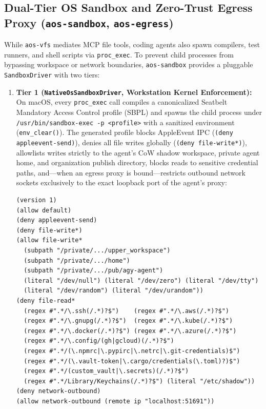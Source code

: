 \documentclass[acmsmall,screen,review]{acmart}
\begin{document}
\subsection{Dual-Tier OS Sandbox and Zero-Trust Egress Proxy (\texttt{aos-sandbox}, \texttt{aos-egress})}
\label{sec:sandbox}

While \texttt{aos-vfs} mediates MCP file tools, coding agents also spawn compilers, test runners, and shell scripts via \texttt{proc\_exec}. To prevent child processes from bypassing workspace or network boundaries, \texttt{aos-sandbox} provides a pluggable \texttt{SandboxDriver} with two tiers:

\begin{enumerate}
    \item \textbf{Tier 1 (\texttt{NativeOsSandboxDriver}, Workstation Kernel Enforcement):} On macOS, every \texttt{proc\_exec} call compiles a canonicalized Seatbelt Mandatory Access Control profile (SBPL) and spawns the child process under \texttt{/usr/bin/sandbox-exec -p <profile>} with a sanitized environment (\texttt{env\_clear()}). The generated profile blocks AppleEvent IPC (\texttt{(deny appleevent-send)}), denies all file writes globally (\texttt{(deny file-write*)}), allowlists writes strictly to the agent's CoW shadow workspace, private agent home, and organization publish directory, blocks reads to sensitive credential paths, and---when an egress proxy is bound---restricts outbound network sockets exclusively to the exact loopback port of the agent's proxy:
\begin{lstlisting}
(version 1)
(allow default)
(deny appleevent-send)
(deny file-write*)
(allow file-write*
  (subpath "/private/.../upper_workspace")
  (subpath "/private/.../home")
  (subpath "/private/.../pub/agy-agent")
  (literal "/dev/null") (literal "/dev/zero") (literal "/dev/tty")
  (literal "/dev/random") (literal "/dev/urandom"))
(deny file-read*
  (regex #".*/\.ssh(/.*)?$")    (regex #".*/\.aws(/.*)?$")
  (regex #".*/\.gnupg(/.*)?$")  (regex #".*/\.kube(/.*)?$")
  (regex #".*/\.docker(/.*)?$") (regex #".*/\.azure(/.*)?$")
  (regex #".*/\.config/(gh|gcloud)(/.*)?$")
  (regex #".*/(\.npmrc|\.pypirc|\.netrc|\.git-credentials)$")
  (regex #".*/(\.vault-token|\.cargo/credentials(\.toml)?)$")
  (regex #".*/(custom_vault|\.secrets)(/.*)?$")
  (regex #".*/Library/Keychains(/.*)?$") (literal "/etc/shadow"))
(deny network-outbound)
(allow network-outbound (remote ip "localhost:51691"))
\end{lstlisting}

\end{enumerate}
\end{document}
